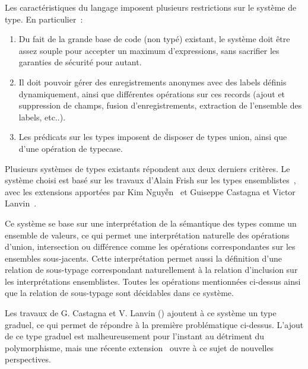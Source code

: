 Les caractéristiques du langage imposent plusieurs restrictions sur le système
de type. En particulier :

\begin{enumerate}
  \item Du fait de la grande base de code (non typé) existant, le système doit
    être assez souple pour accepter un maximum d'expressions, sans sacrifier
    les garanties de sécurité pour autant.

  \item Il doit pouvoir gérer des enregistrements anonymes avec des labels
    définis dynamiquement, ainsi que différentes opérations sur ces records
    (ajout et suppression de champs, fusion d'enregistrements, extraction de
    l'ensemble des labels, etc..).

  \item Les prédicats sur les types imposent de disposer de types union, ainsi
    que d'une opération de typecase.
\end{enumerate}

Plusieurs systèmes de types existants répondent aux deux derniers critères. Le
système choisi est basé sur les travaux d'Alain Frish sur les types
ensemblistes \cite{Fri04}, avec les extensions apportées par Kim
Nguyễn \cite{phdkim} et Guiseppe Castagna et Victor Lanvin \cite{CL16}.

Ce système se base sur une interprétation de la sémantique des types comme un
ensemble de valeurs, ce qui permet une interprétation naturelle des opérations
d'union, intersection ou différence comme les opérations correspondantes sur
les ensembles sous-jacents.
Cette interprétation permet aussi la définition d'une relation de sous-typage
correspondant naturellement à la relation d'inclusion sur les interprétations
ensemblistes.
Toutes les opérations mentionnées ci-dessus ainsi que la relation de
sous-typage sont décidables dans ce système.

Les travaux de G. Castagna et V. Lanvin (\cite{CL16}) ajoutent à ce système un
type graduel, ce qui permet de répondre à la première problématique ci-dessus.
L'ajout de ce type graduel est malheureusement pour l'instant au détriment du
polymorphisme, mais une récente extension \cite{CL17} ouvre à ce sujet de
nouvelles perspectives.
